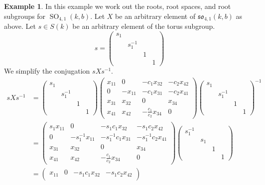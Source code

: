 \documentclass[12pt]{article}
\theoremstyle{definition}
\newtheorem{example}[theorem]{Example}
\newcommand{\inv}{^{-1}}
\newcommand{\frakso}{\mathfrak{so}}
\DeclareMathOperator{\SO}{SO}
\begin{document}
\begin{example}
\label{roots for so41}
In this example we work out the roots, root spaces, and root subgroups for $\SO_{4,1}(k,b)$. Let $X$ be an arbitrary element of $\frakso_{4,1}(k,b)$ as above. Let $s \in S(k)$ be an arbitrary element of the torus subgroup.
\[
	s =
	\begin{pmatrix}
		s_1 \\
		& s_1 \inv \\
		&& 1 \\
		&&& 1
	\end{pmatrix}
\]
We simplify the conjugation $sXs \inv$.
\begin{align*}
	sXs \inv &=
	\begin{pmatrix}
		s_1 \\
		& s_1 \inv \\
		&& 1 \\
		&&& 1
	\end{pmatrix}
	\begin{pmatrix}
		x_{11} & 0 & -c_1 x_{32}  & -c_2 x_{42} \\
		0 & -x_{11} & -c_1 x_{31} & -c_2 x_{41} \\
		x_{31} & x_{32} & 0 & x_{34} \\
		x_{41} & x_{42} & - \frac{c_1}{c_2} x_{34} & 0
	\end{pmatrix}
	\begin{pmatrix}
		s_1 \\
		& s_1 \inv \\
		&& 1 \\
		&&& 1
	\end{pmatrix}
	\inv\\
	&=
	\begin{pmatrix}
		s_1 x_{11} & 0 & - s_1 c_1 x_{32}  & - s_1 c_2 x_{42} \\
		0 & - s_1 \inv x_{11} & - s_1 \inv c_1 x_{31} & - s_1 \inv c_2 x_{41} \\
		x_{31} & x_{32} & 0 & x_{34} \\
		x_{41} & x_{42} & - \frac{c_1}{c_2} x_{34} & 0
	\end{pmatrix}
	\begin{pmatrix}
		s_1 \inv \\
		& s_1 \\
		&& 1 \\
		&&& 1
	\end{pmatrix}  \\
	&=
	\begin{pmatrix}
		x_{11} & 0 & - s_1 c_1 x_{32}  & - s_1 c_2 x_{42} \\

\end{pmatrix}
\end{align*}
\end{example}
\end{document}

